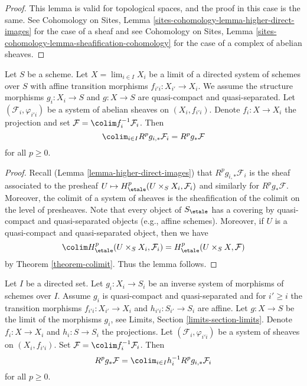\begin{proof}
This lemma is valid for topological spaces, and the proof in this case is the
same. See Cohomology on Sites, Lemma
\ref{sites-cohomology-lemma-higher-direct-images}
for the case of a sheaf and see
Cohomology on Sites, Lemma
\ref{sites-cohomology-lemma-sheafification-cohomology}
for the case of a complex of abelian sheaves.
\end{proof}

\begin{lemma}
\label{lemma-relative-colimit}
Let $S$ be a scheme. Let $X = \lim_{i \in I} X_i$ be a limit of a
directed system of schemes over $S$ with affine transition morphisms
$f_{i'i} : X_{i'} \to X_i$. We assume the structure morphisms
$g_i : X_i \to S$ and $g : X \to S$ are quasi-compact and quasi-separated.
Let $(\mathcal{F}_i, \varphi_{i'i})$ be a system of abelian sheaves
on $(X_i, f_{i'i})$. Denote $f_i : X \to X_i$ the projection and set
$\mathcal{F} = \colim f_i^{-1}\mathcal{F}_i$. Then
$$
\colim_{i\in I} R^p g_{i, *} \mathcal{F}_i = R^p g_* \mathcal{F}
$$
for all $p \geq 0$.
\end{lemma}

\begin{proof}
Recall (Lemma \ref{lemma-higher-direct-images})
that $R^p g_{i, *} \mathcal{F}_i$ is the sheaf associated to the
presheaf $U \mapsto H^p_\etale(U \times_S X_i, \mathcal{F}_i)$
and similarly for $R^pg_*\mathcal{F}$. Moreover, the colimit of a
system of sheaves is the sheafification of the colimit on the level
of presheaves. Note that every object of $S_\etale$ has a covering
by quasi-compact and quasi-separated objects (e.g., affine schemes).
Moreover, if $U$ is a quasi-compact and quasi-separated object,
then we have
$$
\colim H^p_\etale(U \times_S X_i, \mathcal{F}_i) =
H^p_\etale(U \times_S X, \mathcal{F})
$$
by Theorem \ref{theorem-colimit}. Thus the lemma follows.
\end{proof}

\begin{lemma}
\label{lemma-relative-colimit-general}
Let $I$ be a directed set. Let $g_i : X_i \to S_i$ be an inverse system of
morphisms of schemes over $I$. Assume $g_i$ is quasi-compact and
quasi-separated and for $i' \geq i$ the transition morphisms
$f_{i'i} : X_{i'} \to X_i$ and $h_{i'i} : S_{i'} \to S_i$ are affine.
Let $g : X \to S$ be the limit of the morphisms $g_i$, see
Limits, Section \ref{limits-section-limits}.
Denote $f_i : X \to X_i$ and $h_i : S \to S_i$ the projections.
Let $(\mathcal{F}_i, \varphi_{i'i})$ be a system of sheaves
on $(X_i, f_{i'i})$. Set $\mathcal{F} = \colim f_i^{-1}\mathcal{F}_i$. Then
$$
R^p g_* \mathcal{F} =
\colim_{i \in I} h_i^{-1}R^p g_{i, *} \mathcal{F}_i
$$
for all $p \geq 0$.
\end{lemma}

